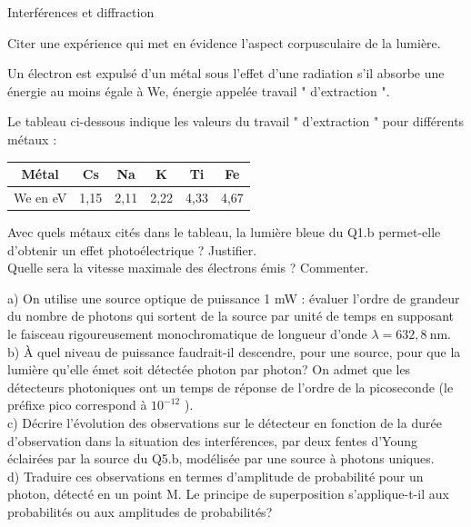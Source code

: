\begin{exo}[PC][1][devoir]{Interférences et diffraction}
{\begin{quest}
  \item Citer une expérience qui met en évidence l'aspect corpusculaire de la lumière.\\
  \item Un électron est expulsé d'un métal sous l'effet d'une radiation s'il absorbe une énergie au moins égale à We, énergie appelée travail " d'extraction ".
\end{quest}
  
Le tableau ci-dessous indique les valeurs du travail " d'extraction " pour différents métaux :

\begin{tabular}{|c|c|c|c|c|c|}
\hline
Métal & Cs & Na & K & Ti & Fe \\
\hline
We en eV & 1,15 & 2,11 & 2,22 & 4,33 & 4,67 \\
\hline
\end{tabular}

Avec quels métaux cités dans le tableau, la lumière bleue du Q1.b permet-elle d'obtenir un effet photoélectrique ? Justifier.\\
Quelle sera la vitesse maximale des électrons émis ? Commenter.\\
\begin{quest}
  \item a) On utilise une source optique de puissance 1 mW : évaluer l'ordre de grandeur du nombre de photons qui sortent de la source par unité de temps en supposant le faisceau rigoureusement monochromatique de longueur d'onde $\lambda=632,8 \mathrm{~nm}$.\\
  b) À quel niveau de puissance faudrait-il descendre, pour une source, pour que la lumière qu'elle émet soit détectée photon par photon? On admet que les détecteurs photoniques ont un temps de réponse de l'ordre de la picoseconde (le préfixe pico correspond à $10^{-12}$ ).\\
  c) Décrire l'évolution des observations sur le détecteur en fonction de la durée d'observation dans la situation des interférences, par deux fentes d'Young éclairées par la source du Q5.b, modélisée par une source à photons uniques.\\
  d) Traduire ces observations en termes d'amplitude de probabilité pour un photon, détecté en un point M. Le principe de superposition s'applique-t-il aux probabilités ou aux amplitudes de probabilités?
\end{quest}
}



\end{exo}
